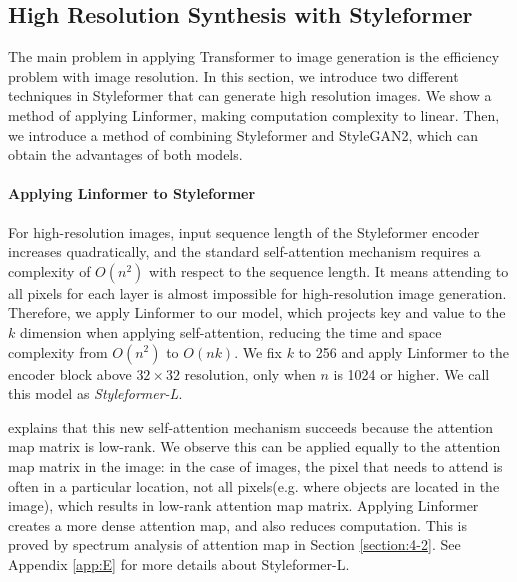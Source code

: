 \documentclass[10pt,twocolumn,letterpaper]{article}
\begin{document}
\subsection{High Resolution Synthesis with Styleformer}
\label{section:3-4}
The main problem in applying Transformer to image generation is the efficiency problem with image resolution. In this section, we introduce two different techniques in Styleformer that can generate high resolution images. We show a method of applying Linformer, making computation complexity to linear. Then, we introduce a method of combining Styleformer and StyleGAN2, which can obtain the advantages of both models.

\paragraph{Applying Linformer to Styleformer}
For high-resolution images, input sequence length of the Styleformer encoder increases quadratically, and the standard self-attention mechanism requires a complexity of $O(n^2)$ with respect to the sequence length. It means attending to all pixels for each layer is almost impossible for high-resolution image generation. Therefore, we apply Linformer \cite{wang2020linformer} to our model, which projects key and value to the $k$ dimension when applying self-attention, reducing the time and space complexity from $O(n^2)$ to $O(nk)$. We fix $k$ to 256 and apply Linformer to the encoder block above $32 \times 32$ resolution, only when $n$ is 1024 or higher. We call this model as \textit{Styleformer-L}. 

\cite{wang2020linformer} explains that this new self-attention mechanism succeeds because the attention map matrix is low-rank. We observe this can be applied equally to the attention map matrix in the image: in the case of images, the pixel that needs to attend is often in a particular location, not all pixels(e.g. where objects are located in the image), which results in low-rank attention map matrix. Applying Linformer creates a more dense attention map, and also reduces computation. This is proved by spectrum analysis of attention map in Section \ref{section:4-2}. See Appendix \ref{app:E} for more details about Styleformer-L.  
\end{document}
